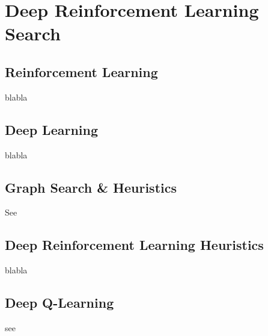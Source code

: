 
\chapter{Deep Reinforcement Learning Search} %

\label{Chapter1} %


\section{Reinforcement Learning}

blabla


\section{Deep Learning}

blabla


\section{Graph Search \& Heuristics}

\label{GSH}

See \cite{DBLP:journals/jacm/DechterP85}



\section{Deep Reinforcement Learning Heuristics}

blabla



\section{Deep Q-Learning}

see \cite{Watkins1992}